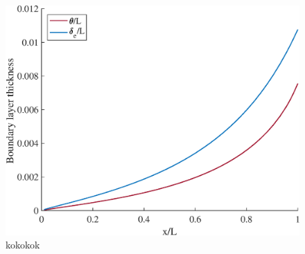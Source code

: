 


\begin{figure}[H]
\centering
\includegraphics[scale=0.70]{graphs/e5g1.eps}
\caption{kokokok}
\label{e1g1}
\end{figure}
